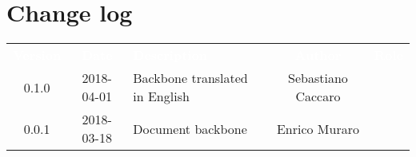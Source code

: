 \section*{Change log}
{
	\renewcommand{\arraystretch}{1.5}
	\centering
	\begin{longtable}{ c c C{6cm} c c }
		\textcolor{white}{\textbf{Version}} & \textcolor{white}{\textbf{Date}} & \textcolor{white}{\textbf{Description}} & \textcolor{white}{\textbf{Author}} & \textcolor{white}{\textbf{Role}}\\
		
		0.1.0 & 2018-04-01 & Backbone translated in English & Sebastiano Caccaro & \reda{}\\
		0.0.1 & 2018-03-18 & Document backbone & Enrico Muraro & \reda{}\\
		
	\end{longtable}

}